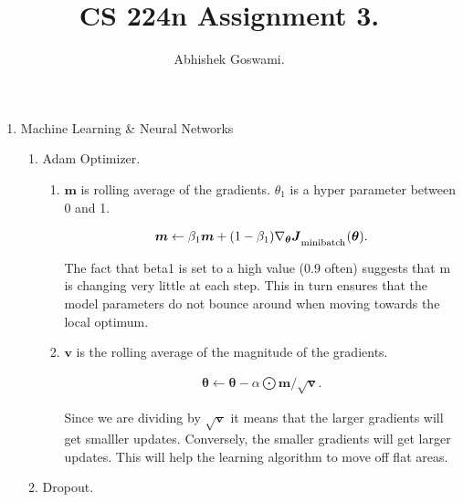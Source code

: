 \documentclass[]{article}
\begin{document}
\title{CS 224n Assignment 3.}
\author{Abhishek Goswami.}
\maketitle

\begin{enumerate}
	\item Machine Learning \& Neural Networks
	
	\begin{enumerate}
		
		\item
		
		Adam Optimizer.
		
		\begin{enumerate}
				
			\item
			
			$\boldsymbol{m}$ is rolling average of the gradients. $\theta_1$ is a hyper parameter between 0 and 1. 
			
		\begin{align}
		\boldsymbol{m} \leftarrow \beta_{1} \boldsymbol{m} + (1 - \beta_{1}) \nabla_{\boldsymbol{\theta}} \boldsymbol{J}_\textsubscript{minibatch}(\boldsymbol{\theta}).
		\end{align}
		
			The fact that beta1 is set to a high value (0.9 often) suggests that m is changing very little at each step.  This in turn ensures that the  model parameters  do not bounce around when moving towards the local optimum.
			\item
			$\boldsymbol{v}$ is the rolling average of the magnitude of the gradients. 
			
		\begin{align}
		\boldsymbol{\theta} \leftarrow \boldsymbol{\theta} - \alpha \bigodot \boldsymbol{m} / \sqrt{\boldsymbol{v}}.
		\end{align}
			
			Since we are dividing by $\sqrt{\boldsymbol{v}}$ it means that the larger  gradients will get smalller updates.   Conversely,  the smaller gradients will get larger updates.  This will help the learning algorithm to move off flat areas.
			
		\end{enumerate}
		
		\item
		
		Dropout.


\end{enumerate}
\end{enumerate}
\end{document}

